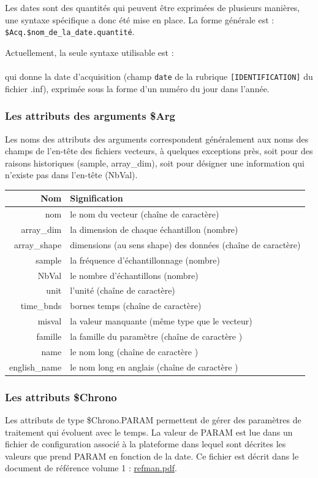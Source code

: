 \medbreak
  Les dates sont des quantités qui peuvent être exprimées de plusieurs manières,
une syntaxe spécifique a donc été mise en place. La forme générale est : \\
\texttt{\$Acq.\$nom\_de\_la\_date.quantité}.

\bigbreak
Actuellement, la seule syntaxe utilisable est : \\
 \\
qui donne la date d'acquisition (champ \texttt{date} de la rubrique
\texttt{[IDENTIFICATION]} du fichier .inf), exprimée sous la forme d'un numéro
du jour dans l'année.


\subsubsection{Les attributs des arguments \$Arg}
\label{sec:Arg}
Les noms des attributs des arguments correspondent
généralement aux noms des champs de l'en-tête des
fichiers vecteurs, à quelques exceptions près, soit
pour des raisons historiques (sample, array\_dim), soit
pour désigner une information qui n'existe pas
dans l'en-tête (NbVal).

\begin{tabular}{r l}
 \textbf{Nom}          & \textbf{Signification}  \\
\hline
 nom & le nom du vecteur (chaîne de caractère)\\
 array\_dim & la dimension de chaque échantillon (nombre)\\
 array\_shape & dimensions (au sens shape) des données (chaîne de caractère)\\
 sample & la fréquence d'échantillonnage (nombre)\\
 NbVal & le nombre d'échantillons (nombre)\\
 unit & l'unité (chaîne de caractère) \\
 time\_bnds & bornes temps (chaîne de caractère)\\
 misval & la valeur manquante (même type que le vecteur) \\
 famille & la famille du paramètre (chaîne de caractère ) \\
 name & le nom long (chaîne de caractère ) \\
 english\_name & le nom long en anglais (chaîne de caractère ) \\
\end{tabular}

\subsubsection{Les attributs \$Chrono}
\label{sec:Chrono}
Les attributs de type \$Chrono.PARAM permettent de gérer des paramètres de
traitement qui évoluent avec le temps. La valeur de PARAM est lue dans un
fichier de configuration associé à la plateforme dans lequel sont décrites
les valeurs que prend PARAM en fonction de la date. Ce fichier est décrit
dans le document de référence volume 1 : \url{refman.pdf}.

